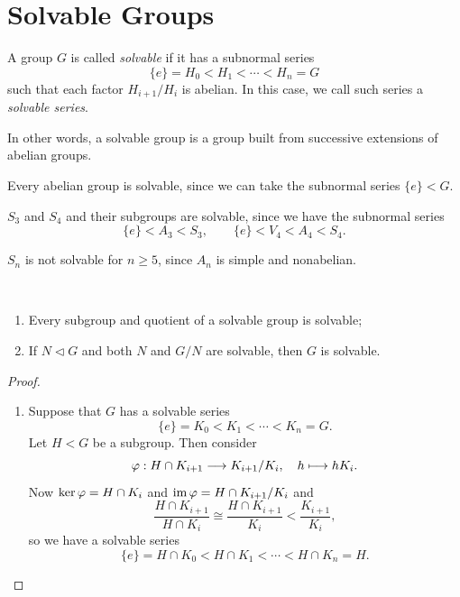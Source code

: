 \section{Solvable Groups}

\begin{definition}
  A group \(G\) is called \emph{solvable} if it has a subnormal series \[
    \{e\} = H_0 < H_1 < \cdots < H_n = G
  \] such that each factor \(H_{i+1}/H_i\) is abelian. In this case, we call such series a \emph{solvable series}.
\end{definition}
In other words, a solvable group is a group built from successive extensions of abelian groups.

\begin{example}
  Every abelian group is solvable, since we can take the subnormal series \(\{e\} < G\).
\end{example}

\begin{example}
  \(S_3\) and \(S_4\) and their subgroups are solvable, since we have the subnormal series \[
    \{e\} < A_3 < S_3, \qquad
    \{e\} < V_4 < A_4 < S_4.
  \]
\end{example}

\begin{example}
  \(S_n\) is not solvable for \(n\geq 5\), since \(A_n\) is simple and nonabelian.
\end{example}

\begin{proposition}\
  \begin{enumerate}
    \item Every subgroup and quotient of a solvable group is solvable;
    \item If \(N\lhd G\) and both \(N\) and \(G/N\) are solvable, then \(G\) is solvable.
  \end{enumerate}
\end{proposition}
\begin{proof}
  \begin{enumerate}[label=(\alph*)]
    \item Suppose that \(G\) has a solvable series \[
      \{e\} = K_0 < K_1 < \cdots < K_n = G.
    \] Let \(H < G\) be a subgroup. Then consider \[
      \varphi:H\cap K_{i+1} \longrightarrow K_{i+1}/K_i, \quad
      h \longmapsto hK_i.
    \] Now \(\ker\varphi = H\cap K_i\) and \(\operatorname{im}\varphi = H\cap K_{i+1}/K_i\) and \[
      \frac{H\cap K_{i+1}}{H\cap K_i} \cong \frac{H\cap K_{i+1}}{K_i} < \frac{K_{i+1}}{K_i},
    \] so we have a solvable series \[
      \{e\} = H\cap K_0 < H\cap K_1 < \cdots < H\cap K_n = H.
    \]
  \end{enumerate}
\end{proof}

